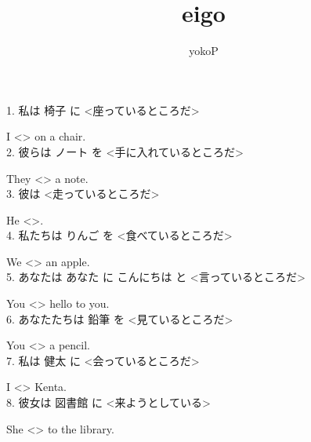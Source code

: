 \documentclass[uplatex,
paper=a4,
fontsize=18pt,
jafontsize=16pt,
number_of_lines=30,
line_length=30zh,
baselineskip=25pt,
]{jlreq}
\author{yokoP}
\title{eigo}
\begin{document}
1.  私は 椅子 に <座っているところだ>

  I <\hspace{3em}\hspace{3em}\hspace{2em}> on a chair.
\\

2.  彼らは ノート を <手に入れているところだ>

  They <\hspace{3em}\hspace{3em}\hspace{2em}> a note.
\\

3.  彼は <走っているところだ>

  He <\hspace{3em}\hspace{3em}\hspace{2em}>.
\\

4.  私たちは りんご を <食べているところだ>

  We <\hspace{3em}\hspace{3em}\hspace{2em}> an apple.
\\

5.  あなたは あなた に こんにちは と <言っているところだ>

  You <\hspace{3em}\hspace{3em}\hspace{2em}> hello to you.
\\

6.  あなたたちは 鉛筆 を <見ているところだ>

  You <\hspace{3em}\hspace{3em}\hspace{2em}> a pencil.
\\

7.  私は 健太 に <会っているところだ>

  I <\hspace{3em}\hspace{3em}\hspace{2em}> Kenta.
\\

8.  彼女は 図書館 に <来ようとしている>

  She <\hspace{3em}\hspace{3em}\hspace{2em}> to the library.
\\
\end{document}
